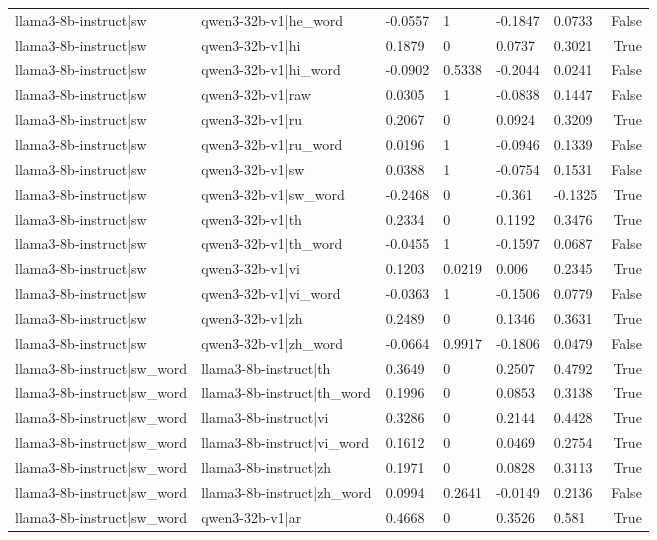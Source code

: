 \begin{table}
\begin{tabular}{llllllr}
llama3-8b-instruct|sw & qwen3-32b-v1|he_word & -0.0557 & 1 & -0.1847 & 0.0733 & False \\
llama3-8b-instruct|sw & qwen3-32b-v1|hi & 0.1879 & 0 & 0.0737 & 0.3021 & True \\
llama3-8b-instruct|sw & qwen3-32b-v1|hi_word & -0.0902 & 0.5338 & -0.2044 & 0.0241 & False \\
llama3-8b-instruct|sw & qwen3-32b-v1|raw & 0.0305 & 1 & -0.0838 & 0.1447 & False \\
llama3-8b-instruct|sw & qwen3-32b-v1|ru & 0.2067 & 0 & 0.0924 & 0.3209 & True \\
llama3-8b-instruct|sw & qwen3-32b-v1|ru_word & 0.0196 & 1 & -0.0946 & 0.1339 & False \\
llama3-8b-instruct|sw & qwen3-32b-v1|sw & 0.0388 & 1 & -0.0754 & 0.1531 & False \\
llama3-8b-instruct|sw & qwen3-32b-v1|sw_word & -0.2468 & 0 & -0.361 & -0.1325 & True \\
llama3-8b-instruct|sw & qwen3-32b-v1|th & 0.2334 & 0 & 0.1192 & 0.3476 & True \\
llama3-8b-instruct|sw & qwen3-32b-v1|th_word & -0.0455 & 1 & -0.1597 & 0.0687 & False \\
llama3-8b-instruct|sw & qwen3-32b-v1|vi & 0.1203 & 0.0219 & 0.006 & 0.2345 & True \\
llama3-8b-instruct|sw & qwen3-32b-v1|vi_word & -0.0363 & 1 & -0.1506 & 0.0779 & False \\
llama3-8b-instruct|sw & qwen3-32b-v1|zh & 0.2489 & 0 & 0.1346 & 0.3631 & True \\
llama3-8b-instruct|sw & qwen3-32b-v1|zh_word & -0.0664 & 0.9917 & -0.1806 & 0.0479 & False \\
llama3-8b-instruct|sw_word & llama3-8b-instruct|th & 0.3649 & 0 & 0.2507 & 0.4792 & True \\
llama3-8b-instruct|sw_word & llama3-8b-instruct|th_word & 0.1996 & 0 & 0.0853 & 0.3138 & True \\
llama3-8b-instruct|sw_word & llama3-8b-instruct|vi & 0.3286 & 0 & 0.2144 & 0.4428 & True \\
llama3-8b-instruct|sw_word & llama3-8b-instruct|vi_word & 0.1612 & 0 & 0.0469 & 0.2754 & True \\
llama3-8b-instruct|sw_word & llama3-8b-instruct|zh & 0.1971 & 0 & 0.0828 & 0.3113 & True \\
llama3-8b-instruct|sw_word & llama3-8b-instruct|zh_word & 0.0994 & 0.2641 & -0.0149 & 0.2136 & False \\
llama3-8b-instruct|sw_word & qwen3-32b-v1|ar & 0.4668 & 0 & 0.3526 & 0.581 & True \\

\end{tabular}
\end{table}
